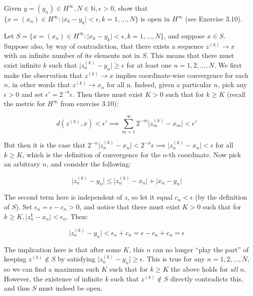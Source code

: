 \begin{exercise}{10}
    Given $y = (y_n) \in H^{\infty}, N \in \mathbb{N}, \epsilon > 0$, show that $\{x = (x_n) \in H^{\infty}: \lvert x_k - y_k \rvert < \epsilon, k =1, \ldots, N\}$ is open in $H^{\infty}$ (see Exercise 3.10).
\end{exercise}

\begin{solution}
    
    Let $S = \{x = (x_n) \in H^{\infty}: \lvert x_k - y_k \rvert < \epsilon, k =1, \ldots, N\}$, and suppose $x \in S$.
    Suppose also, by way of contradiction, that there exists a sequence $z^{(k)} \rightarrow x$ with an infinite number of its elements not in $S$.
    This means that there must exist infinite $k$ such that $\lvert z^{(k)}_n - y_n \rvert \geq \epsilon$ for at least one $n = 1, 2, \ldots, N$.
    We first make the observation that $z^{(k)} \rightarrow x$ implies coordinate-wise convergence for each $n$, in other words that $z^{(k)} \rightarrow x_n$ for all n.
    Indeed, given a particular $n$, pick any $\epsilon > 0$ and set $\epsilon' = 2^{-n} \epsilon$.
    Then there must exist $K > 0$ such that for $k \geq K$ (recall the metric for $H^{\infty}$ from exercise 3.10):

    $$d(z^{(k)}, x) < \epsilon' \implies \sum_{m=1}^{\infty} 2^{-m} \lvert z^{(k)}_m - x_m \rvert < \epsilon'$$

    But then it is the case that $2^{-n} \lvert z^{(k)}_n - x_n \rvert < 2^{-n}\epsilon \implies \lvert z^{(k)}_n - x_n \rvert < \epsilon$ for all $k \geq K$, which is the definition of convergence for the $n$-th coordinate.
    Now pick an arbitrary $n$, and consider the following:

    $$\lvert z_n^{(k)} - y_n \rvert \leq \lvert z_n^{(k)} - x_n \rvert + \lvert x_n - y_n \rvert $$

    The second term here is independent of $z$, so let it equal $c_n < \epsilon$ (by the definition of $S$).
    Set $\epsilon_n = \epsilon - c_n > 0$, and notice that there must exist $K > 0$ such that for $k \geq K, \lvert z_n^{k} - x_n \rvert < \epsilon_n$.
    Then:

    $$\lvert z_n^{(k)} - y_n \rvert < \epsilon_n + c_n = \epsilon - c_n + c_n = \epsilon$$

    The implication here is that after some $K$, this $n$ can no longer ``play the part'' of keeping $z^{(k)} \notin S$ by satisfying $\lvert z_n^{(k)} - y_n \rvert \geq \epsilon$.
    This is true for any $n = 1, 2, \ldots, N$, so we can find a maximum such $K$ such that for $k \geq K$ the above holds for \textit{all} $n$.
    However, the existence of infinite $k$ such that $z^{(k)} \notin S$ directly contradicts this, and thus $S$ must indeed be open.

\end{solution}


